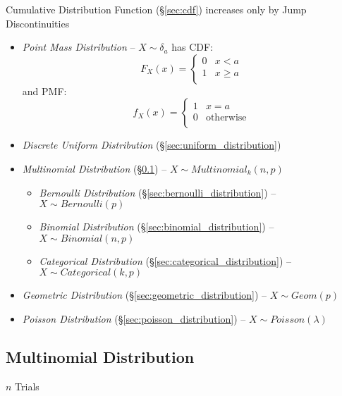 Cumulative Distribution Function (\S\ref{sec:cdf}) increases only by Jump
Discontinuities

\begin{itemize}
  \item \emph{Point Mass Distribution} -- $X \sim \delta_a$ has CDF:
    \[
      F_X(x) = \begin{cases}
        0 & x <    a \\
        1 & x \geq a \\
      \end{cases}
    \]
    and PMF:
    \[
      f_X(x) = \begin{cases}
        1 & x = a \\
        0 & \text{otherwise} \\
      \end{cases}
    \]
  \item \emph{Discrete Uniform Distribution} (\S\ref{sec:uniform_distribution})
  \item \emph{Multinomial Distribution} (\S\ref{sec:multinomial_distribution})
    -- $X \sim Multinomial_k(n,p)$
  \begin{itemize}
    \item \emph{Bernoulli Distribution} (\S\ref{sec:bernoulli_distribution}) --
      $X \sim Bernoulli(p)$
    \item \emph{Binomial Distribution} (\S\ref{sec:binomial_distribution}) --
      $X \sim Binomial(n,p)$
    \item \emph{Categorical Distribution} (\S\ref{sec:categorical_distribution})
      -- $X \sim Categorical(k,p)$
  \end{itemize}
  \item \emph{Geometric Distribution} (\S\ref{sec:geometric_distribution}) --
    $X \sim Geom(p)$
  \item \emph{Poisson Distribution} (\S\ref{sec:poisson_distribution}) --
    $X \sim Poisson(\lambda)$
\end{itemize}



\subsection{Multinomial Distribution}\label{sec:multinomial_distribution}

$n$ Trials

